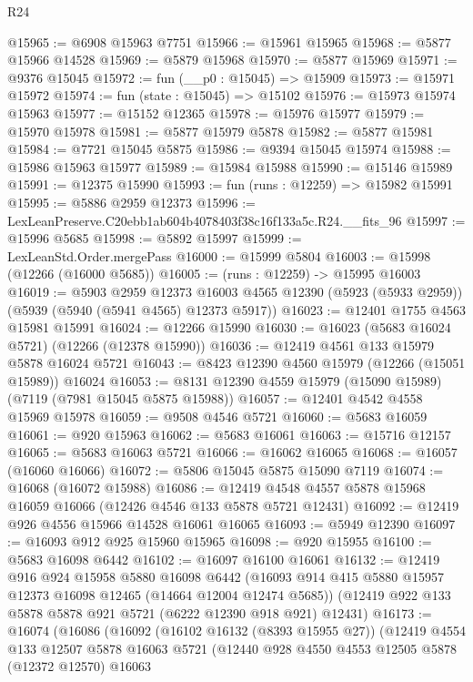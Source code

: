 \begin{lexlean}{R24}
\begin{coremodule}
@15965 := @6908 @15963 @7751
@15966 := @15961 @15965
@15968 := @5877 @15966 @14528
@15969 := @5879 @15968
@15970 := @5877 @15969
@15971 := @9376 @15045
@15972 := fun (__p0 : @15045) => @15909
@15973 := @15971 @15972
@15974 := fun (state : @15045) => @15102
@15976 := @15973 @15974 @15963
@15977 := @15152 @12365
@15978 := @15976 @15977
@15979 := @15970 @15978
@15981 := @5877 @15979 @5878
@15982 := @5877 @15981
@15984 := @7721 @15045 @5875
@15986 := @9394 @15045 @15974
@15988 := @15986 @15963 @15977
@15989 := @15984 @15988
@15990 := @15146 @15989
@15991 := @12375 @15990
@15993 := fun (runs : @12259) => @15982 @15991
@15995 := @5886 @2959 @12373
@15996 := LexLeanPreserve.C20ebb1ab604b4078403f38c16f133a5c.R24.__fits_96
@15997 := @15996 @5685
@15998 := @5892 @15997
@15999 := LexLeanStd.Order.mergePass
@16000 := @15999 @5804
@16003 := @15998 (@12266 (@16000 @5685))
@16005 := (runs : @12259) -> @15995 @16003
@16019 := @5903
    @2959
    @12373
    @16003
    @4565
    @12390
    (@5923 (@5933 @2959))
    (@5939 (@5940 (@5941 @4565) @12373 @5917))
@16023 := @12401 @1755 @4563 @15981 @15991
@16024 := @12266 @15990
@16030 := @16023 (@5683 @16024 @5721) (@12266 (@12378 @15990))
@16036 := @12419 @4561 @133 @15979 @5878 @16024 @5721
@16043 := @8423 @12390 @4560 @15979 (@12266 (@15051 @15989)) @16024
@16053 := @8131 @12390 @4559 @15979 (@15090 @15989) (@7119 (@7981 @15045 @5875 @15988))
@16057 := @12401 @4542 @4558 @15969 @15978
@16059 := @9508 @4546 @5721
@16060 := @5683 @16059
@16061 := @920 @15963
@16062 := @5683 @16061
@16063 := @15716 @12157
@16065 := @5683 @16063 @5721
@16066 := @16062 @16065
@16068 := @16057 (@16060 @16066)
@16072 := @5806 @15045 @5875 @15090 @7119
@16074 := @16068 (@16072 @15988)
@16086 := @12419 @4548 @4557 @5878 @15968 @16059 @16066 (@12426 @4546 @133 @5878 @5721 @12431)
@16092 := @12419 @926 @4556 @15966 @14528 @16061 @16065
@16093 := @5949 @12390
@16097 := @16093 @912 @925 @15960 @15965
@16098 := @920 @15955
@16100 := @5683 @16098 @6442
@16102 := @16097 @16100 @16061
@16132 := @12419
    @916
    @924
    @15958
    @5880
    @16098
    @6442
    (@16093 @914 @415 @5880 @15957 @12373 @16098 @12465 (@14664 @12004 @12474 @5685))
    (@12419 @922 @133 @5878 @5878 @921 @5721 (@6222 @12390 @918 @921) @12431)
@16173 := @16074
    (@16086
      (@16092
        (@16102 @16132 (@8393 @15955 @27))
        (@12419
          @4554
          @133
          @12507
          @5878
          @16063
          @5721
          (@12440
            @928
            @4550
            @4553
            @12505
            @5878
            (@12372 @12570)
            @16063

\end{coremodule}
\end{lexlean}
